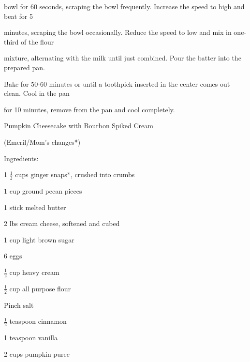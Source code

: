 \documentclass[a4paper,portrait,12pt]{book}
\begin{document}
bowl for 60 seconds, scraping the bowl frequently. Increase the speed to high and beat for 5




minutes, scraping the bowl occasionally. Reduce the speed to low and mix in one-third of the flour




mixture, alternating with the milk until just combined. Pour the batter into the prepared pan.




Bake for 50-60 minutes or until a toothpick inserted in the center comes out clean. Cool in the pan




for 10 minutes, remove from the pan and cool completely.







\newpage
Pumpkin Cheesecake with Bourbon Spiked Cream




(Emeril/Mom's changes*)




Ingredients:




1 $\frac{1}{2}$ cups ginger snaps*, crushed into crumbs




1 cup ground pecan pieces




1 stick melted butter




2 lbs cream cheese, softened and cubed




1 cup light brown sugar




6 eggs




$\frac{1}{2}$ cup heavy cream




$\frac{1}{2}$ cup all purpose flour




Pinch salt




$\frac{1}{2}$ teaspoon cinnamon




1 teaspoon vanilla




2 cups pumpkin puree
\end{document}
